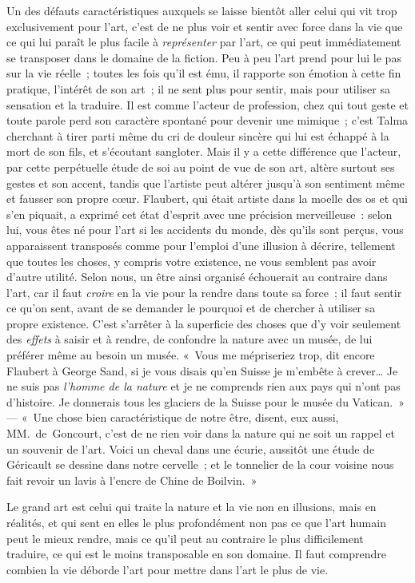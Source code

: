 \documentclass[french,twoside]{book} %
\begin{document}
Un des défauts caractéristiques auxquels se laisse bientôt aller celui qui vit trop exclusivement pour l’art, c’est de ne plus voir et sentir avec force dans la vie que ce qui lui paraît le plus facile à \emph{représenter} par l’art, ce qui peut immédiatement se transposer dans le domaine de la fiction. Peu à peu l’art prend pour lui le pas sur la vie réelle ; toutes les fois qu’il est ému, il rapporte son émotion à cette fin pratique, l’intérêt de son art ; il ne sent plus pour sentir, mais pour utiliser sa sensation et la traduire. Il est comme l’acteur de profession, chez qui tout geste et toute parole perd son caractère spontané pour devenir une mimique ; c’est Talma cherchant à tirer parti même du cri de douleur sincère qui lui est échappé à la mort de son fils, et s’écoutant sangloter. Mais il y a cette différence que l’acteur, par cette perpétuelle étude de soi au point de vue de son art, altère surtout ses gestes et son accent, tandis que l’artiste peut altérer jusqu’à son sentiment même et fausser son propre cœur. Flaubert, qui était artiste dans la moelle des os et qui s’en piquait, a exprimé cet état d’esprit avec une précision merveilleuse : selon lui, vous êtes né pour l’art si les accidents du monde, dès qu’ils sont perçus, vous apparaissent transposés comme pour l’emploi d’une illusion à décrire, tellement que toutes les choses, y compris votre existence, ne vous semblent pas avoir d’autre utilité. Selon nous, un être ainsi organisé échouerait au contraire dans l’art, car il faut \emph{croire} en la vie pour la rendre dans toute sa force ; il faut sentir ce qu’on sent, avant de se demander le pourquoi et de chercher à utiliser sa propre existence. C’est s’arrêter à la superficie des choses que d’y voir seulement des \emph{effets} à saisir et à rendre, de confondre la nature avec un musée, de lui préférer même au besoin un musée. « Vous me mépriseriez trop, dit encore Flaubert à George Sand, si je vous disais qu’en Suisse je m’embête à crever… Je ne suis pas \emph{l’homme de la nature} et je ne comprends rien aux pays qui n’ont pas d’histoire. Je donnerais tous les glaciers de la Suisse pour le musée du Vatican. » — « Une chose bien caractéristique de notre être, disent, eux aussi, MM. de Goncourt, c’est de ne rien voir dans la nature qui ne soit un rappel et un souvenir de l’art. Voici un cheval dans une écurie, aussitôt une étude de Géricault se dessine dans notre cervelle ; et le tonnelier de la cour voisine nous fait revoir un lavis à l’encre de Chine de Boilvin. »\par
Le grand art est celui qui traite la nature et la vie non en illusions, mais en réalités, et qui sent en elles le plus profondément non pas ce que l’art humain peut le mieux rendre, mais ce qu’il peut au contraire le plus difficilement traduire, ce qui est le moins transposable en son domaine. Il faut comprendre combien la vie déborde l’art pour mettre dans l’art le plus de vie.\par
\end{document}
